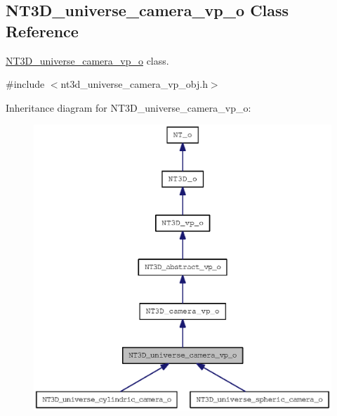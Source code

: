 \subsection{NT3D\_\-universe\_\-camera\_\-vp\_\-o Class Reference}
\label{class_n_t3_d__universe__camera__vp__o}


\hyperlink{class_n_t3_d__universe__camera__vp__o}{NT3D\_\-universe\_\-camera\_\-vp\_\-o} class.  




{\ttfamily \#include $<$nt3d\_\-universe\_\-camera\_\-vp\_\-obj.h$>$}



Inheritance diagram for NT3D\_\-universe\_\-camera\_\-vp\_\-o:
\nopagebreak
\begin{figure}[H]
\begin{center}
\leavevmode
\includegraphics[width=400pt]{class_n_t3_d__universe__camera__vp__o__inherit__graph}
\end{center}
\end{figure}


